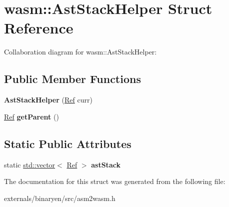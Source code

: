 \hypertarget{structwasm_1_1_ast_stack_helper}{}\section{wasm\+:\+:Ast\+Stack\+Helper Struct Reference}
\label{structwasm_1_1_ast_stack_helper}


Collaboration diagram for wasm\+:\+:Ast\+Stack\+Helper\+:
\subsection*{Public Member Functions}
\begin{DoxyCompactItemize}
\item 
\mbox{\label{structwasm_1_1_ast_stack_helper_a253b746ed2f5db1f59a01fac1e7fae25}} 
{\bfseries Ast\+Stack\+Helper} (\mbox{\hyperlink{structcashew_1_1_ref}{Ref}} curr)
\item 
\mbox{\label{structwasm_1_1_ast_stack_helper_a75064262b6d70f9522a9012b5b73ddcb}} 
\mbox{\hyperlink{structcashew_1_1_ref}{Ref}} {\bfseries get\+Parent} ()
\end{DoxyCompactItemize}
\subsection*{Static Public Attributes}
\begin{DoxyCompactItemize}
\item 
\mbox{\label{structwasm_1_1_ast_stack_helper_a8fd24297f602dab31833d96fdbe8e01f}} 
static \mbox{\hyperlink{classstd_1_1vector}{std\+::vector}}$<$ \mbox{\hyperlink{structcashew_1_1_ref}{Ref}} $>$ {\bfseries ast\+Stack}
\end{DoxyCompactItemize}


The documentation for this struct was generated from the following file\+:\begin{DoxyCompactItemize}
\item 
externals/binaryen/src/asm2wasm.\+h\end{DoxyCompactItemize}
